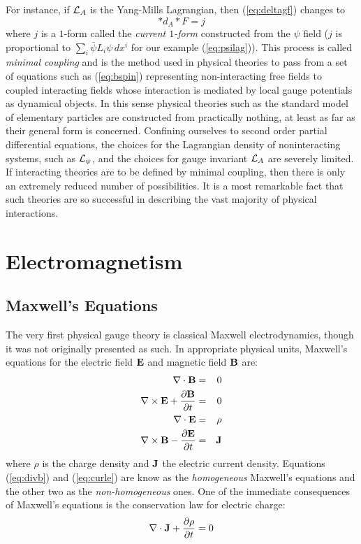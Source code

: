 \documentclass[12pt,titlepage]{article}
\def\cL{{\cal L}}
\begin{document}
For instance, if \(\cL_A\) is the Yang-Mills Lagrangian, then 
(\ref{eq:deltagf}) changes to 
\begin{equation}\label{eq:delgfj}
*d_A*F = j
\end{equation}
where \(j\) is a \(1\)-form called the {\em current \(1\)-form\/}
constructed from the \(\psi\) field (\(j\) is proportional to 
\(\sum_i\bar\psi L_i\psi\,dx^i\) for our example (\ref{eq:psilag})). 
This process is called {\em
minimal coupling\/}
%
 and is the method used in physical theories to pass
from a set of equations such as (\ref{eq:bspin}) representing 
non-interacting free fields to coupled interacting fields whose interaction
is mediated by local gauge potentials as dynamical objects. In this
sense physical theories
such as the standard model of elementary
particles
 are constructed from practically nothing, 
at least as far as their general form is concerned. Confining ourselves
to second order partial differential equations, the choices for the
Lagrangian density of noninteracting systems, such as \(\cL_\psi\), and
the choices for gauge invariant \(\cL_A\) are severely limited. 
If interacting theories are to be defined by minimal coupling, 
then there is only an
extremely reduced number of possibilities. It is a most remarkable
fact that such theories are so successful in describing the vast majority
of physical interactions. 

\section{Electromagnetism}
\subsection{Maxwell's Equations}\label{sec:maxwell}
The very first physical gauge theory is classical Maxwell
electrodynamics, though it was not originally presented as such. 
In appropriate physical units, Maxwell's equations
%
for the electric field
%
 \(\bf E\) and magnetic  field
%
 \(\bf B\) are:
\begin{eqnarray}\label{eq:divb}%
{\bf\nabla} \cdot {\bf B} &=& 0 \\ \label{eq:curle}
{\bf\nabla} \times {\bf E} +\frac{\partial {\bf B} }{\partial t} &=& 0 \\
\label{eq:dive}{\bf\nabla} \cdot {\bf E} &=& \rho \\ \label{eq:curlb}
{\bf\nabla} \times {\bf B} -\frac{\partial {\bf E} }{\partial t} &=& 
{\bf J} 
\end{eqnarray}%
where \(\rho\) is the charge density
 and \({\bf J}\) the 
electric current density.
Equations (\ref{eq:divb}) and (\ref{eq:curle}) are know as the {\em
homogeneous\/} Maxwell's equations and the other two as the 
{\em non-homogeneous\/} ones. One of the immediate consequences of 
Maxwell's
equations is the conservation law for electric charge:
\[%
{\bf \nabla}\cdot {\bf J} + \frac{\partial\rho}{\partial t} = 0
\]%
\end{document}
